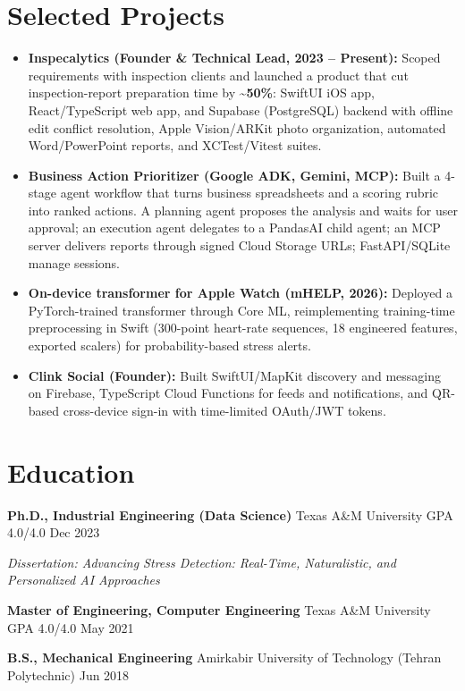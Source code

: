 \documentclass[letterpaper,10pt]{article}
\begin{document}
\section{Selected Projects}
\begin{itemize}
\item \textbf{Inspecalytics (Founder \& Technical Lead, 2023 -- Present):} Scoped requirements with inspection clients and launched a product that cut inspection-report preparation time by \textbf{\textasciitilde 50\%}: SwiftUI iOS app, React/TypeScript web app, and Supabase (PostgreSQL) backend with offline edit conflict resolution, Apple Vision/ARKit photo organization, automated Word/PowerPoint reports, and XCTest/Vitest suites.
\item \textbf{Business Action Prioritizer (Google ADK, Gemini, MCP):} Built a 4-stage agent workflow that turns business spreadsheets and a scoring rubric into ranked actions. A planning agent proposes the analysis and waits for user approval; an execution agent delegates to a PandasAI child agent; an MCP server delivers reports through signed Cloud Storage URLs; FastAPI/SQLite manage sessions.
\item \textbf{On-device transformer for Apple Watch (mHELP, 2026):} Deployed a PyTorch-trained transformer through Core ML, reimplementing training-time preprocessing in Swift (300-point heart-rate sequences, 18 engineered features, exported scalers) for probability-based stress alerts.
\item \textbf{Clink Social (Founder):} Built SwiftUI/MapKit discovery and messaging on Firebase, TypeScript Cloud Functions for feeds and notifications, and QR-based cross-device sign-in with time-limited OAuth/JWT tokens.
\end{itemize}

\section{Education}
\textbf{Ph.D., Industrial Engineering (Data Science)} \textbar{} Texas A\&M University \textbar{} GPA 4.0/4.0 \hfill Dec 2023\par
{\itshape Dissertation: Advancing Stress Detection: Real-Time, Naturalistic, and Personalized AI Approaches}\par\vspace{2pt}
\textbf{Master of Engineering, Computer Engineering} \textbar{} Texas A\&M University \textbar{} GPA 4.0/4.0 \hfill May 2021\par\vspace{2pt}
\textbf{B.S., Mechanical Engineering} \textbar{} Amirkabir University of Technology (Tehran Polytechnic) \hfill Jun 2018\par
\end{document}
